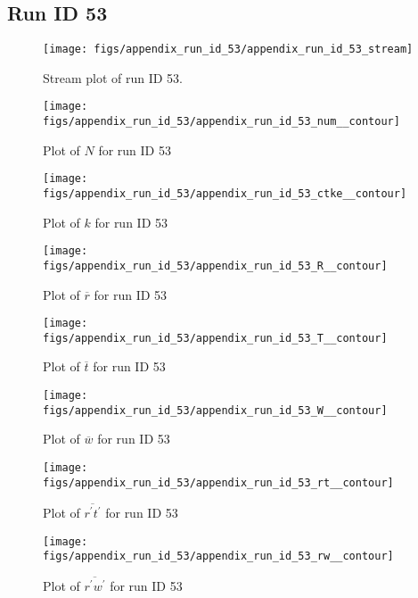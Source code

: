 \subsection{Run ID 53}
\begin{figure}[H]
\centering
\texttt{[image: figs/appendix\_run\_id\_53/appendix\_run\_id\_53\_stream]}
\caption{Stream plot of run ID 53.}
\label{fig:appendix_run_id_53_stream}
\end{figure}


\begin{figure}[H]
\centering
\texttt{[image: figs/appendix\_run\_id\_53/appendix\_run\_id\_53\_num\_\_contour]}
\caption{Plot of $N$ for run ID 53}
\label{fig:appendix_run_id_53_num__contour}
\end{figure}


\begin{figure}[H]
\centering
\texttt{[image: figs/appendix\_run\_id\_53/appendix\_run\_id\_53\_ctke\_\_contour]}
\caption{Plot of $k$ for run ID 53}
\label{fig:appendix_run_id_53_ctke__contour}
\end{figure}


\begin{figure}[H]
\centering
\texttt{[image: figs/appendix\_run\_id\_53/appendix\_run\_id\_53\_R\_\_contour]}
\caption{Plot of $\overline{r}$ for run ID 53}
\label{fig:appendix_run_id_53_R__contour}
\end{figure}


\begin{figure}[H]
\centering
\texttt{[image: figs/appendix\_run\_id\_53/appendix\_run\_id\_53\_T\_\_contour]}
\caption{Plot of $\overline{t}$ for run ID 53}
\label{fig:appendix_run_id_53_T__contour}
\end{figure}


\begin{figure}[H]
\centering
\texttt{[image: figs/appendix\_run\_id\_53/appendix\_run\_id\_53\_W\_\_contour]}
\caption{Plot of $\overline{w}$ for run ID 53}
\label{fig:appendix_run_id_53_W__contour}
\end{figure}


\begin{figure}[H]
\centering
\texttt{[image: figs/appendix\_run\_id\_53/appendix\_run\_id\_53\_rt\_\_contour]}
\caption{Plot of $\overline{r^\prime t^\prime}$ for run ID 53}
\label{fig:appendix_run_id_53_rt__contour}
\end{figure}


\begin{figure}[H]
\centering
\texttt{[image: figs/appendix\_run\_id\_53/appendix\_run\_id\_53\_rw\_\_contour]}
\caption{Plot of $\overline{r^\prime w^\prime}$ for run ID 53}
\label{fig:appendix_run_id_53_rw__contour}
\end{figure}


